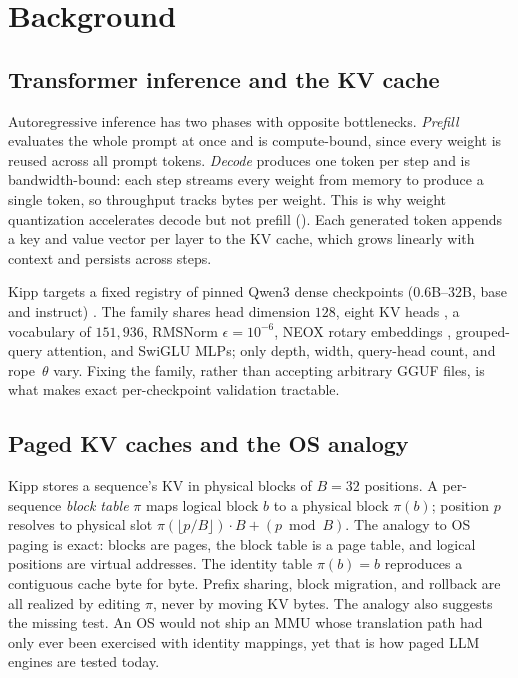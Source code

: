 \documentclass[sigconf,nonacm,screen]{acmart}
\begin{document}
\section{Background}
\label{sec:bg}

\subsection{Transformer inference and the KV cache}
Autoregressive inference has two phases with opposite bottlenecks.
\emph{Prefill} evaluates the whole prompt at once and is compute-bound, since
every weight is reused across all prompt tokens. \emph{Decode} produces one
token per step and is bandwidth-bound: each step streams every weight from
memory to produce a single token, so throughput tracks bytes per weight.
This is why weight quantization accelerates decode but not prefill
(). Each generated token appends a key and value
vector per layer to the KV cache, which grows linearly with context and
persists across steps.

Kipp targets a fixed registry of pinned Qwen3 dense checkpoints
(0.6B--32B, base and instruct) \citep{yang2025qwen3}. The family shares
head dimension $128$, eight KV heads \citep{ainslie2023gqa}, a vocabulary
of $151{,}936$, RMSNorm $\epsilon=10^{-6}$, NEOX rotary embeddings
\citep{su2024rope}, grouped-query attention, and SwiGLU MLPs; only depth,
width, query-head count, and rope~$\theta$ vary. Fixing the family, rather than accepting
arbitrary GGUF files, is what makes exact per-checkpoint validation
tractable.

\subsection{Paged KV caches and the OS analogy}
Kipp stores a sequence's KV in physical blocks of $B{=}32$ positions. A
per-sequence \emph{block table} $\pi$ maps logical block $b$ to a physical
block $\pi(b)$; position $p$ resolves to physical slot
$\pi(\lfloor p/B\rfloor)\cdot B + (p \bmod B)$. The analogy to OS paging is
exact: blocks are pages, the block table is a page table, and logical
positions are virtual addresses. The identity table $\pi(b){=}b$ reproduces a
contiguous cache byte for byte. Prefix sharing, block migration, and rollback
are all realized by editing $\pi$, never by moving KV bytes. The analogy also
suggests the missing test. An OS would not ship an MMU whose translation path
had only ever been exercised with identity mappings, yet that is how paged
LLM engines are tested today.
\end{document}
